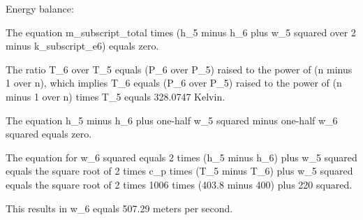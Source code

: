Energy balance:

The equation m_subscript_total times (h_5 minus h_6 plus w_5 squared over 2 minus k_subscript_e6) equals zero.

The ratio T_6 over T_5 equals (P_6 over P_5) raised to the power of (n minus 1 over n), which implies T_6 equals (P_6 over P_5) raised to the power of (n minus 1 over n) times T_5 equals 328.0747 Kelvin.

The equation h_5 minus h_6 plus one-half w_5 squared minus one-half w_6 squared equals zero.

The equation for w_6 squared equals 2 times (h_5 minus h_6) plus w_5 squared equals the square root of 2 times c_p times (T_5 minus T_6) plus w_5 squared equals the square root of 2 times 1006 times (403.8 minus 400) plus 220 squared.

This results in w_6 equals 507.29 meters per second.